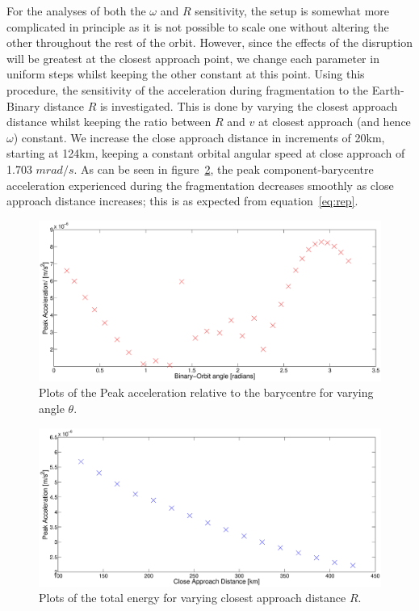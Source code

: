 \documentclass[letterpaper, preprint, paper,11pt]{AAS}	%
\begin{document}
For the analyses of both the $\omega$ and $R$ sensitivity, the setup is somewhat more complicated in principle as it is not possible to scale one without altering the other throughout the rest of the orbit. However, since the effects of the disruption will be greatest at the closest approach point, we change each parameter in uniform steps whilst keeping the other constant at this point. 
Using this procedure, the sensitivity of the acceleration during fragmentation to the Earth-Binary distance $R$ is investigated. This is done by varying the closest approach distance whilst keeping the ratio between $R$ and $v$ at closest approach (and hence $\omega$) constant. We increase the close approach distance in increments of 20km, starting at 124km, keeping a constant orbital angular speed at close approach of 1.703 $mrad/s$. As can be seen in figure~\ref{fig:Rsens}, the peak component-barycentre acceleration experienced during the fragmentation decreases smoothly as close approach distance increases; this is as expected from equation~\ref{eq:rep}.
 \begin{figure}[H]
\centering
\centerline{\includegraphics[width=1.0\textwidth]{theta_sens.eps}} 
\caption{Plots of the Peak acceleration relative to the barycentre for varying angle $\theta$.} 
\label{fig:theta}
\end{figure}
\begin{figure}[H]
\centering
\centerline{\includegraphics[width=1.1\textwidth]{Rsens_accel_1.eps}} 
\caption{Plots of the total energy for varying closest approach distance $R$.} 
\label{fig:Rsens}
\end{figure} 
\end{document}
